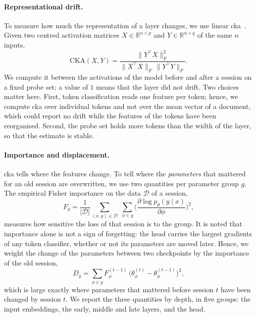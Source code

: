 \paragraph{Representational drift.} To measure how much the representation of a layer
changes, we use linear \gls{cka}~\citep{kornblith2019similarity}. Given two centred
activation matrices $X\in\mathbb{R}^{n\times p}$ and $Y\in\mathbb{R}^{n\times q}$ of the same
$n$ inputs,
\begin{equation}
  \mathrm{CKA}(X,Y)=\frac{\lVert Y^{\top}X\rVert_F^{2}}
  {\lVert X^{\top}X\rVert_F\,\lVert Y^{\top}Y\rVert_F}.
  \label{eq:cka}
\end{equation}
We compute it between the activations of the model before and after a session on a fixed
probe set; a value of $1$ means that the layer did not drift. Two choices matter here.
First, token classification reads one feature per token; hence, we compute \gls{cka} over
individual tokens and not over the mean vector of a document, which could report no drift
while the features of the tokens have been reorganised. Second, the probe set holds more
tokens than the width of the layer, so that the estimate is stable.

\paragraph{Importance and displacement.} \gls{cka} tells where the features change. To tell
where the \emph{parameters} that mattered for an old session are overwritten, we use two
quantities per parameter group $g$. The empirical Fisher importance on the data
$\mathcal{D}$ of a session,
\begin{equation}
  F_g=\frac{1}{|\mathcal{D}|}\sum_{(x,y)\in\mathcal{D}}\;\sum_{\phi\in g}
  \Big(\frac{\partial\log p_\theta(y\mid x)}{\partial\phi}\Big)^{2},
  \label{eq:fisher}
\end{equation}
measures how sensitive the loss of that session is to the group. It is noted that importance
alone is not a sign of forgetting: the head carries the largest gradients of any token
classifier, whether or not its parameters are moved later. Hence, we weight the change of the
parameters between two checkpoints by the importance of the old session,
\begin{equation}
  D_g=\sum_{\phi\in g}F^{(t-1)}_{\phi}\,\big(\theta^{(t)}_{\phi}-\theta^{(t-1)}_{\phi}\big)^{2},
  \label{eq:displacement}
\end{equation}
which is large exactly where parameters that mattered before session $t$ have been changed
by session $t$. We report the three quantities by depth, in five groups: the input
embeddings, the early, middle and late layers, and the head.


